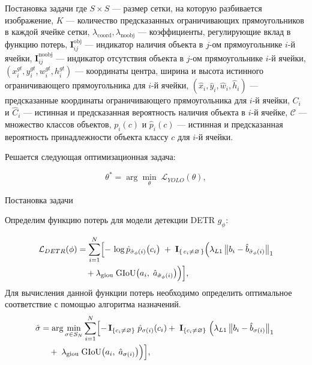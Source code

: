 \documentclass{beamer}
\begin{document}
\begin{frame}{Постановка задачи}
\small{
где 
$S \times S$ — размер сетки, на которую разбивается изображение,
$K$ — количество предсказанных ограничивающих прямоугольников в каждой ячейке сетки,  
$\lambda_{\text{coord}}, \lambda_{\text{noobj}}$ — коэффициенты, регулирующие вклад  в функцию потерь,
$\textbf{I}_{ij}^{\text{obj}}$ — индикатор наличия объекта в $j$-ом прямоугольнике $i$-й ячейки,  
$\textbf{I}_{ij}^{\text{noobj}}$ — индикатор отсутствия объекта в $j$-ом прямоугольнике $i$-й ячейки,  
$(x^{gt}_i, y^{gt}_i, w^{gt}_i, h^{gt}_i)$ — координаты центра, ширина и высота истинного ограничивающего прямоугольника для $i$-й ячейки,  
$(\hat{x}_i, \hat{y}_i, \hat{w}_i, \hat{h}_i)$ — предсказанные координаты ограничивающего прямоугольника для $i$-й ячейки,  
$C_i$ и $\hat{C}_i$ — истинная и предсказанная вероятность наличия объекта в $i$-й ячейке,  \(\mathcal{C}\) — множество классов объектов,
$p_i(c)$ и $\hat{p}_i(c)$ — истинная и предсказанная вероятность принадлежности объекта классу $c$ для $i$-й ячейки.}

\begin{center}
Решается следующая оптимизационная задача:
\end{center}
\[
\theta^* = \arg\min_{\theta}\;\mathcal{L}_{YOLO}(\theta),
\]

\end{frame}
\begin{frame}{Постановка задачи}


Определим функцию потерь для модели детекции DETR $g_{\phi}$:

\begin{align*}
\mathcal{L}_{DETR}(\phi)
&= \sum_{i=1}^N \Bigl[
-\,\log \hat p_{\hat\sigma_{\phi}(i)}\bigl(c_i\bigr)
\;+\;
\mathbf{I}_{\{\,c_i \neq \varnothing\,\}}\Bigl(
\lambda_{L1}\,\bigl\lVert b_i - \hat b_{\hat\sigma_{\phi}(i)}\bigr\rVert_{1}
\\
&\quad
+
\lambda_{\mathrm{giou}}\;{\mathrm{GIoU}}\bigl(a_i,\;\hat a_{\hat\sigma_{\phi}(i)}\bigr)
\Bigr)
\Bigr],
\end{align*}
Для вычисления данной функции потерь необходимо определить оптимальное соответствие с помощью алгоритма назначений.
\begin{align*}
\hat\sigma 
&= \arg\min_{\sigma\in S_N} \sum_{i=1}^N \Bigl[
-\,\mathbf{I}_{\{c_i\neq\varnothing\}}\;\hat p_{\sigma(i)}(c_i)
+\;\mathbf{I}_{\{c_i\neq\varnothing\}}\;\Bigl(\lambda_{L1}\,\bigl\lVert b_i - \hat b_{\sigma(i)}\bigr\rVert_{1}
\;
\\
&\quad
+
\;\lambda_{\mathrm{giou}}\;\mathrm{GIoU}\bigl(a_i,\;\hat a_{\sigma(i)}\bigr)\Bigr)
\Bigr],
\end{align*}

\end{frame}
\end{document}
